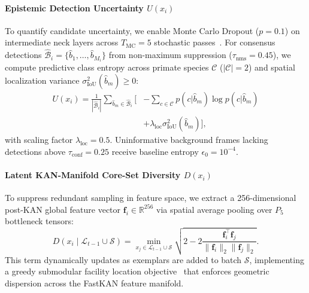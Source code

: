 \documentclass[conference]{IEEEtran}
\begin{document}
\paragraph{Epistemic Detection Uncertainty $U(x_i)$}
To quantify candidate uncertainty, we enable Monte Carlo Dropout ($p=0.1$) on intermediate neck layers across $T_{\text{MC}} = 5$ stochastic passes~\cite{gal2016dropout,kao2018localization}. For consensus detections $\hat{\mathcal{B}}_i = \{\hat{b}_1, \dots, \hat{b}_{M_i}\}$ from non-maximum suppression ($\tau_{\text{nms}}=0.45$), we compute predictive class entropy across primate species $\mathcal{C}$ ($|\mathcal{C}|=2$) and spatial localization variance $\sigma_{\text{IoU}}^2(\hat{b}_m) \ge 0$:
\begin{equation}
\begin{aligned}
  U(x_i) = \frac{1}{|\hat{\mathcal{B}}_i|} \sum_{\hat{b}_m \in \hat{\mathcal{B}}_i} \Big[ &-\sum_{c \in \mathcal{C}} p(c|\hat{b}_m) \log p(c|\hat{b}_m) \\
  &+ \lambda_{\text{loc}} \sigma_{\text{IoU}}^2(\hat{b}_m) \Big],
\end{aligned}
\label{eq:uncertainty}
\end{equation}
with scaling factor $\lambda_{\text{loc}} = 0.5$. Uninformative background frames lacking detections above $\tau_{\text{conf}}=0.25$ receive baseline entropy $\epsilon_0 = 10^{-4}$.

\paragraph{Latent KAN-Manifold Core-Set Diversity $D(x_i)$}
To suppress redundant sampling in feature space, we extract a 256-dimensional post-KAN global feature vector $\mathbf{f}_i \in \mathbb{R}^{256}$ via spatial average pooling over $P_5$ bottleneck tensors:
\begin{equation}
  D(x_i \mid \mathcal{L}_{t-1} \cup \mathcal{S}) = \min_{x_j \in \mathcal{L}_{t-1} \cup \mathcal{S}} \sqrt{2 - 2 \frac{\mathbf{f}_i^\top \mathbf{f}_j}{\|\mathbf{f}_i\|_2 \|\mathbf{f}_j\|_2}}.
  \label{eq:diversity}
\end{equation}
This term dynamically updates as exemplars are added to batch $\mathcal{S}$, implementing a greedy submodular facility location objective~\cite{sener2018active} that enforces geometric dispersion across the FastKAN feature manifold.
\end{document}
